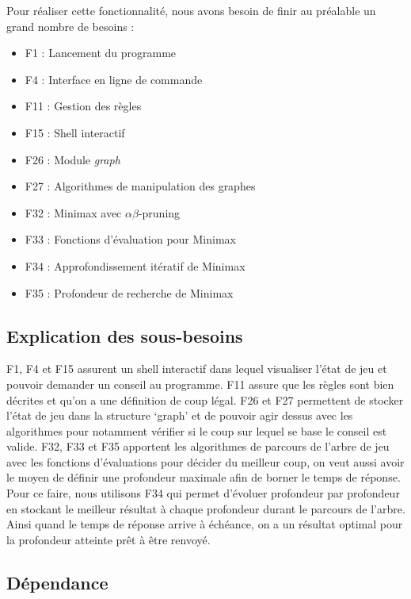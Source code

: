 \documentclass[11pt]{article}
\begin{document}
\vspace{0.5em}
\normalsize

Pour réaliser cette fonctionnalité, nous avons besoin de finir au préalable un grand nombre de besoins : 
\begin{itemize}
  \item [-] F1 : Lancement du programme
  \item [-] F4 : Interface en ligne de commande
  \item [-] F11 : Gestion des règles
  \item [-] F15 : Shell interactif
  \item [-] F26 : Module \textit{graph}
  \item [-] F27 : Algorithmes de manipulation des graphes
  \item [-] F32 : Minimax avec $\alpha$$\beta$-pruning
  \item [-] F33 : Fonctions d’évaluation pour Minimax
  \item [-] F34 : Approfondissement itératif de Minimax
  \item [-] F35 : Profondeur de recherche de Minimax
\end{itemize}

\subsection{Explication des sous-besoins}

\normalsize
\vspace{0.5em}
F1, F4 et F15 assurent un shell interactif dans lequel visualiser l’état de jeu et pouvoir demander un conseil au programme. 
F11 assure que les règles sont bien décrites et qu’on a une définition de coup légal. 
F26 et F27 permettent de stocker l’état de jeu dans la structure ‘graph’ et de pouvoir agir dessus avec les algorithmes pour notamment vérifier si le coup sur lequel se base le conseil est valide.
F32, F33 et F35 apportent les algorithmes de parcours de l’arbre de jeu avec les fonctions d’évaluations pour décider du meilleur coup, on veut aussi avoir le moyen de définir une profondeur maximale afin de borner le temps de réponse.
Pour ce faire, nous utilisons F34 qui permet d'évoluer profondeur par profondeur en stockant le meilleur résultat à chaque profondeur durant le parcours de l'arbre. 
Ainsi quand le temps de réponse arrive à échéance, on a un résultat optimal pour la profondeur atteinte prêt à être renvoyé.



\subsection{Dépendance}
\end{document}
